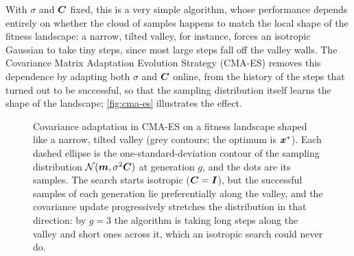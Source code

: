 With $\sigma$ and $\bm{C}$ fixed, this is a very simple algorithm, whose performance depends entirely on whether the cloud of samples happens to match the local shape of the fitness landscape: a narrow, tilted valley, for instance, forces an isotropic Gaussian to take tiny steps, since most large steps fall off the valley walls. The Covariance Matrix Adaptation Evolution Strategy (CMA-ES) \cite{hansen2001cma, hansen2016tutorial} removes this dependence by adapting both $\sigma$ and $\bm{C}$ online, from the history of the steps that turned out to be successful, so that the sampling distribution itself learns the shape of the landscape; \autoref{fig:cma-es} illustrates the effect.

\begin{figure}[htbp]
\centering
{}
\caption[Covariance adaptation in CMA-ES]{Covariance adaptation in CMA-ES on a fitness landscape shaped like a narrow, tilted valley (grey contours; the optimum is $\bm{x}^{*}$). Each dashed ellipse is the one-standard-deviation contour of the sampling distribution $\mathcal{N}(\bm{m}, \sigma^2 \bm{C})$ at generation $g$, and the dots are its samples. The search starts isotropic ($\bm{C} = \bm{I}$), but the successful samples of each generation lie preferentially along the valley, and the covariance update progressively stretches the distribution in that direction: by $g=3$ the algorithm is taking long steps along the valley and short ones across it, which an isotropic search could never do.}

\end{figure}
